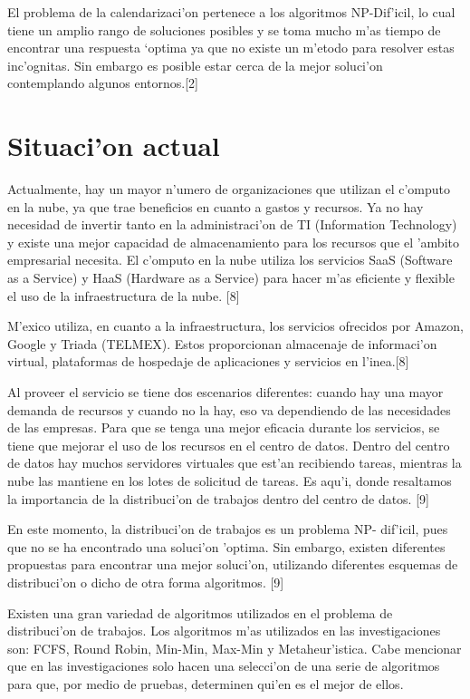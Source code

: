 El problema de la calendarizaci'on pertenece a los algoritmos NP-Dif'icil, lo cual tiene un amplio rango de soluciones posibles y se toma mucho m'as tiempo de encontrar una respuesta ‘optima ya que no existe un m'etodo para resolver estas inc'ognitas. Sin embargo es posible estar cerca de la mejor soluci'on contemplando algunos entornos.[2]

\section*{Situaci'on actual}

Actualmente, hay un mayor n'umero de organizaciones que utilizan el c'omputo en la nube, ya que trae beneficios en cuanto a gastos y recursos. Ya no hay necesidad de invertir tanto en la administraci'on de TI (Information Technology) y existe una mejor capacidad de almacenamiento para los recursos que el 'ambito empresarial necesita.
El c'omputo en la nube utiliza los servicios SaaS (Software as a Service) y HaaS (Hardware as a Service) para hacer m'as eficiente y flexible el uso de la infraestructura de la nube. [8]

M'exico utiliza, en cuanto a la infraestructura, los servicios ofrecidos por Amazon, Google y Triada (TELMEX). Estos proporcionan almacenaje de informaci'on virtual, plataformas de hospedaje de aplicaciones y servicios en l'inea.[8] 

Al proveer el servicio se tiene dos escenarios diferentes: cuando hay una mayor demanda de recursos y cuando no la hay,  eso va dependiendo de las necesidades de las empresas. 
Para que se tenga una mejor eficacia durante los servicios, se tiene que mejorar el uso de los recursos en el centro de datos. Dentro del centro de datos hay muchos servidores virtuales que est'an recibiendo tareas, mientras la nube las mantiene en los lotes de solicitud de tareas. Es aqu'i, donde resaltamos la importancia de la distribuci'on de trabajos dentro del centro de datos. [9]

En este momento, la distribuci'on de trabajos es un problema NP- dif'icil, pues que no se ha encontrado una soluci'on 'optima. Sin embargo, existen diferentes propuestas para encontrar una mejor soluci'on, utilizando diferentes esquemas de distribuci'on o dicho de otra forma algoritmos. [9]

Existen una gran variedad de algoritmos utilizados en el problema de distribuci'on de trabajos. Los algoritmos m'as utilizados en las investigaciones son: FCFS, Round Robin, Min-Min, Max-Min y Metaheur'istica. Cabe mencionar que en las investigaciones solo hacen una selecci'on de una serie de algoritmos para que, por medio de pruebas, determinen qui'en es el mejor de ellos. 

